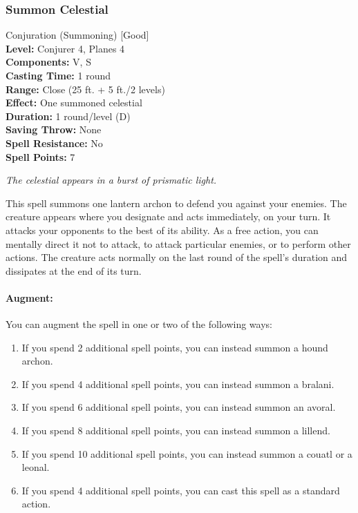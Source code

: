 \subsubsection{Summon Celestial}
\label{Spell:SummonCelestial}
Conjuration (Summoning) [Good]
\\ \textbf{Level:} Conjurer 4, Planes 4
\\ \textbf{Components:} V, S
\\ \textbf{Casting Time:} 1 round
\\ \textbf{Range:} Close (25 ft. + 5 ft./2 levels)
\\ \textbf{Effect:} One summoned celestial
\\ \textbf{Duration:} 1 round/level (D)
\\ \textbf{Saving Throw:} None
\\ \textbf{Spell Resistance:} No
\\ \textbf{Spell Points:} 7

\emph{The celestial appears in a burst of prismatic light.}

This spell summons one lantern archon to defend you against your enemies.
The creature appears where you designate and acts immediately, on your turn. 
It attacks your opponents to the best of its ability. 
As a free action, you can mentally direct it not to attack, to attack particular enemies, or to perform other actions. 
The creature acts normally on the last round of the spell's duration and dissipates at the end of its turn.

\paragraph{Augment:} You can augment the spell in one or two of the following ways: 
\begin{enumerate}
 \item If you spend 2 additional spell points, you can instead summon a hound archon.
 \item If you spend 4 additional spell points, you can instead summon a bralani.
 \item If you spend 6 additional spell points, you can instead summon an avoral.
 \item If you spend 8 additional spell points, you can instead summon a lillend.
 \item If you spend 10 additional spell points, you can instead summon a couatl or a leonal.
 \item If you spend 4 additional spell points, you can cast this spell as a standard action.
\end{enumerate}
